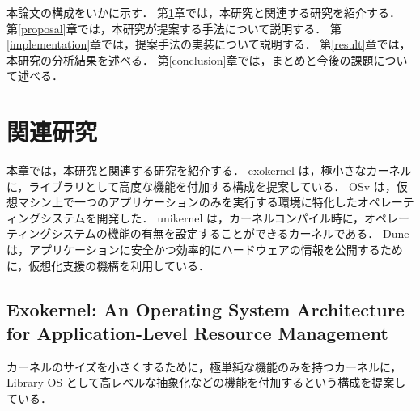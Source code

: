 \documentclass[graduation-thesis]{mlarticle}
\begin{document}
本論文の構成をいかに示す．
第\ref{relative}章では，本研究と関連する研究を紹介する．
第\ref{proposal}章では，本研究が提案する手法について説明する．
第\ref{implementation}章では，提案手法の実装について説明する．
第\ref{result}章では，本研究の分析結果を述べる．
第\ref{conclusion}章では，まとめと今後の課題について述べる．

\clearpage
\section {関連研究}
\label{relative}

本章では，本研究と関連する研究を紹介する．
exokernel は，極小さなカーネルに，ライブラリとして高度な機能を付加する構成を提案している．
OSv は，仮想マシン上で一つのアプリケーションのみを実行する環境に特化したオペレーティングシステムを開発した．
unikernel は，カーネルコンパイル時に，オペレーティングシステムの機能の有無を設定することができるカーネルである．
Duneは，アプリケーションに安全かつ効率的にハードウェアの情報を公開するために，仮想化支援の機構を利用している．

\subsection {Exokernel: An Operating System Architecture for Application-Level Resource Management}
\label{relative:exokernel}
カーネルのサイズを小さくするために，極単純な機能のみを持つカーネルに，Library OS として高レベルな抽象化などの機能を付加するという構成を提案している．
\end{document}
